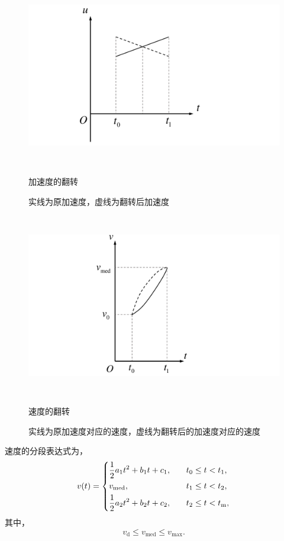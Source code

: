 \begin{figure}[htbp]
\begin{minipage}{0.50\textwidth}
  \centering
  \includegraphics[height=8cm,trim={5cm 0 9cm 0},clip]{figures/uvert.pdf}
  \caption{加速度的翻转}
  \caption*{\small 实线为原加速度，虚线为翻转后加速度}
  \caption*{}
  \label{fig:uvert}
\end{minipage}\hfill
\begin{minipage}{0.45\textwidth}
  \centering
  \includegraphics[height=8cm,trim={7cm 0 8cm 0},clip]{figures/vvert.pdf}
  \caption{速度的翻转}
  \caption*{实线为原加速度对应的速度，虚线为翻转后的加速度对应的速度}
  \label{fig:vvert}
\end{minipage}
\end{figure}

速度的分段表达式为，
\begin{equation}
v(t)=
\begin{dcases}
\frac12 a_1t^2+b_1t+c_1,\quad& t_0\leq t < t_1,\\
v_\mathrm{med}, \quad& t_1\leq t < t_2,\\
\frac12 a_2t^2+b_2t+c_2,\quad& t_2\leq t < t_\mathrm{m},
\end{dcases}
\end{equation}
其中，
\begin{equation}
v_\mathrm{d}\leq v_\mathrm{med}\leq v_{\max}.
\label{eq:num:vc1}
\end{equation}

